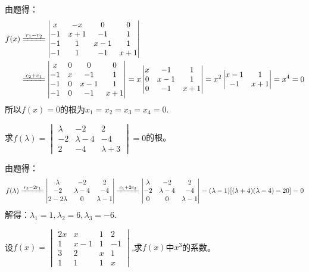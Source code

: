 \documentclass[a4paper]{report}
\begin{document}
\begin{jie}
由题得：
\begin{align*}
f(x)&\xlongequal{r_1-r_2}
\begin{vmatrix}
x &-x&0&0\\
-1&x+1&-1&1\\
-1&1&x-1&1\\
-1&1&-1&x+1
\end{vmatrix}\\ &\xlongequal{c_2+c_1}\begin{vmatrix}
x &0&0&0\\
-1&x&-1&1\\
-1&0&x-1&1\\
-1&0&-1&x+1
\end{vmatrix}
=x\begin{vmatrix}
x&-1&1\\
0&x-1&1\\
0&-1&x+1
\end{vmatrix}
=x^2\begin{vmatrix}
x-1&1\\
-1&x+1
\end{vmatrix}=x^4=0
\end{align*}
所以$f(x)=0$的根为$x_1=x_2=x_3=x_4=0$.
\end{jie}

\EX 求$f(\lambda)=
\begin{vmatrix}
\lambda &-2&2\\
-2&\lambda-4&-4\\
2&-4&\lambda+3
\end{vmatrix}=0
$的根。

\begin{jie}
由题得：
\begin{equation*}
f(\lambda)\xlongequal{r_3-2r_1}
\begin{vmatrix}
\lambda &-2&2\\
-2&\lambda-4&-4\\
2-2\lambda&0&\lambda-1
\end{vmatrix}\xlongequal{c_1+2c_{3}}
\begin{vmatrix}
\lambda &-2&2\\
-2&\lambda-4&-4\\
0&0&\lambda-1
\end{vmatrix}=(\lambda-1)[(\lambda+4)(\lambda-4)-20]=0
\end{equation*}
解得：$\lambda_1=1,\lambda_2=6,\lambda_3=-6$.
\end{jie}

\EX 设$f(x)=
\begin{vmatrix}
2x&x&1&2\\
1&x-1&1&-1\\
3&2&x&1\\
1&1&1&x
\end{vmatrix}
$,求$f(x)$中$x^3$的系数。
\end{document}
